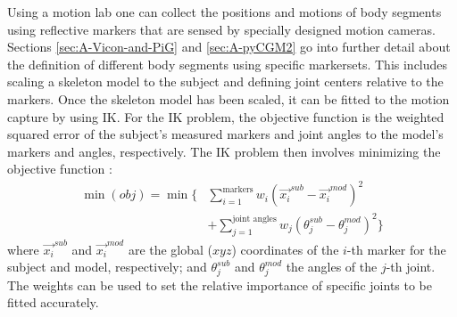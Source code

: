 \documentclass[../main.tex]{subfiles}
\begin{document}
Using a motion lab one can collect the positions and motions of body segments using reflective markers that are sensed by specially designed motion cameras.
Sections \ref{sec:A-Vicon-and-PiG} and \ref{sec:A-pyCGM2} go into further detail about the definition of different body segments using specific markersets.
This includes scaling a skeleton model to the subject and defining joint centers relative to the markers.
Once the skeleton model has been scaled, it can be fitted to the motion capture by using \ac{IK}.
For the \ac{IK} problem, the objective function is the weighted squared error of the subject's measured markers and joint angles to the model's markers and angles, respectively.
The \ac{IK} problem then involves minimizing the objective function \cite{Delp2007}:
\begin{align}
\label{eq:ik-obj-func}
    \min(obj) = \min\biggl\{ &\sum_{i=1}^{\text{markers}}w_i \left(\Vec{x_i}^{sub}-\Vec{x_i}^{mod}\right)^2 \nonumber\\ 
    &+ \sum_{j=1}^{\text{joint angles}}w_j \left( \theta_j^{sub}-\theta_j^{mod}\right)^2 \biggr\}
\end{align}
where $\Vec{x_i}^{sub}$ and $\Vec{x_i}^{mod}$ are the global ($xyz$) coordinates of the $i$-th marker for the subject and model, respectively; 
and $\theta_j^{sub}$ and $\theta_j^{mod}$ the angles of the $j$-th joint.
The weights can be used to set the relative importance of specific joints to be fitted accurately.
\end{document}
